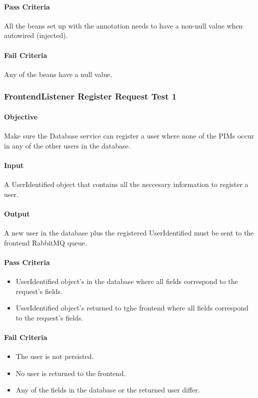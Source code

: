\documentclass[hidelinks,english]{article}
\begin{document}
				\paragraph{Pass Criteria} All the beans set up with the \emph{\@Bean} annotation needs to have a non-null value when autowired (injected).
				\paragraph{Fail Criteria} Any of the beans have a null value.
		
			\subsubsection{FrontendListener Register Request Test 1}\label{databasebusinesslistenerregistertest1}
				\paragraph{Objective} Make sure the Database service can register a user where none of the PIMs occur in any of the other users in the database.
				\paragraph{Input} A UserIdentified object that contains all the neccesary information to register a user.
				\paragraph{Output} A new user in the database plus the registered UserIdentified must be sent to the frontend RabbitMQ queue.
				\paragraph{Pass Criteria}
				\begin{itemize}
					\item UserIdentified object's in the database where all fields correspond to the request's fields.
					\item UserIdentified object's returned to tghe frontend where all fields correspond to the request's fields.
				\end{itemize}
				\paragraph{Fail Criteria}
				\begin{itemize}
					\item The user is not persisted.
					\item No user is returned to the frontend.
					\item Any of the fields in the database or the returned user differ.
				\end{itemize}
				
\end{document}
